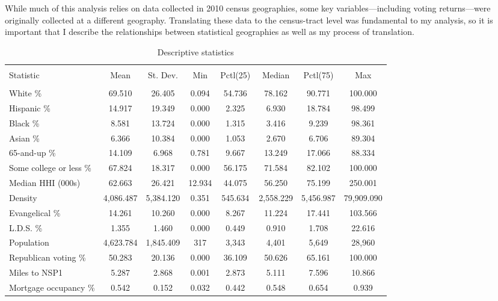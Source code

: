 \documentclass[12pt,oneside]{psthesis}
\begin{document}
While much of this analysis relies on data collected in 2010 census geographies, some key variables---including voting returns---were originally collected at a different geography.
Translating these data to the census-tract level was fundamental to my analysis, so it is important that I describe the relationships between statistical geographies as well as my process of translation.
\begin{table}[!htbp] \centering 
  \caption{Descriptive statistics} 
  \label{} 
\begin{tabular}{@{\extracolsep{5pt}}lccccccc} 
\\[-1.8ex]\hline 
\hline \\[-1.8ex] 
Statistic & \multicolumn{1}{c}{Mean} & \multicolumn{1}{c}{St. Dev.} & \multicolumn{1}{c}{Min} & \multicolumn{1}{c}{Pctl(25)} & \multicolumn{1}{c}{Median} & \multicolumn{1}{c}{Pctl(75)} & \multicolumn{1}{c}{Max} \\ 
\hline \\[-1.8ex] 
White \% & 69.510 & 26.405 & 0.094 & 54.736 & 78.162 & 90.771 & 100.000 \\ 
Hispanic \% & 14.917 & 19.349 & 0.000 & 2.325 & 6.930 & 18.784 & 98.499 \\ 
Black \% & 8.581 & 13.724 & 0.000 & 1.315 & 3.416 & 9.239 & 98.361 \\ 
Asian \% & 6.366 & 10.384 & 0.000 & 1.053 & 2.670 & 6.706 & 89.304 \\ 
65-and-up \% & 14.109 & 6.968 & 0.781 & 9.667 & 13.249 & 17.066 & 88.334 \\ 
Some college or less \% & 67.824 & 18.317 & 0.000 & 56.175 & 71.584 & 82.102 & 100.000 \\ 
Median HHI (000s) & 62.663 & 26.421 & 12.934 & 44.075 & 56.250 & 75.199 & 250.001 \\ 
Density & 4,086.487 & 5,384.120 & 0.351 & 545.634 & 2,558.229 & 5,456.987 & 79,909.090 \\ 
Evangelical \% & 14.261 & 10.260 & 0.000 & 8.267 & 11.224 & 17.441 & 103.566 \\ 
L.D.S. \% & 1.355 & 1.460 & 0.000 & 0.449 & 0.910 & 1.708 & 22.616 \\ 
Population & 4,623.784 & 1,845.409 & 317 & 3,343 & 4,401 & 5,649 & 28,960 \\ 
Republican voting \% & 50.283 & 20.136 & 0.000 & 36.109 & 50.626 & 65.161 & 100.000 \\ 
Miles to NSP1 & 5.287 & 2.868 & 0.001 & 2.873 & 5.111 & 7.596 & 10.866 \\ 
Mortgage occupancy \% & 0.542 & 0.152 & 0.032 & 0.442 & 0.548 & 0.654 & 0.939 \\ 

\end{tabular}
\end{table}
\end{document}
